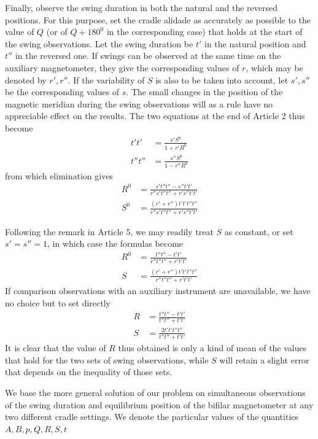 Finally, observe the swing duration in both the natural and the reversed positions. For this purpose, set the cradle alidade as accurately as possible to the value of $Q$ (or of $Q+180^0$ in the corresponding case) that holds at the start of the swing observations. Let the swing duration be $t'$ in the natural position and $t''$ in the reversed one. If swings can be observed at the same time on the auxiliary magnetometer, they give the corresponding values of $r$, which may be denoted by $r',r''$. If the variability of $S$ is also to be taken into account, let $s',s''$ be the corresponding values of $s$. The small changes in the position of the magnetic meridian during the swing observations
will as a rule have no appreciable effect on the results. The two equations at the end of Article 2 thus become
\[
\begin{aligned}
t't'&=\frac{s'S^0}{1+r'R^0}\\
t''t''&=\frac{s''S^0}{1-r''R^0}
\end{aligned}
\]
from which elimination gives
\[
\begin{aligned}
R^0&=\frac{s't''t''-s''t't'}{r''s't''t''+r's''t't'}\\
S^0&=\frac{(r'+r'')t't't''t''}{r''s't''t''+r's''t't'}
\end{aligned}
\]

Following the remark in Article 5, we may readily treat $S$ as constant, or set $s'=s''=1$, in which case the formulas become
\[
\begin{aligned}
R^0&=\frac{t''t''-t't'}{r''t''t''+r't't'}\\
S&=\frac{(r'+r'')t't't''t''}{r''t''t''+r't't'}
\end{aligned}
\]
If comparison observations with an auxiliary instrument are unavailable, we have no choice but to set directly
\[
\begin{aligned}
R&=\frac{t''t''-t't'}{t''t''+t't'}\\
S&=\frac{2t't't''t''}{t''t''+t't'}
\end{aligned}
\]
It is clear that the value of $R$ thus obtained is only a kind of mean of the values that hold for the two sets of swing observations, while $S$ will retain a slight error that depends on the inequality of those sets.

We base the more general solution of our problem on simultaneous observations of the swing duration and equilibrium position of the bifilar magnetometer at any two different cradle settings. We denote the particular values of the quantities $A,B,p,Q,R,S,t$

